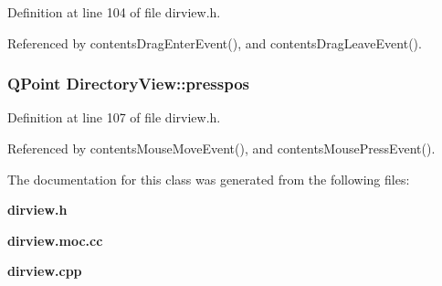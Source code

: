 Definition at line 104 of file dirview.h.

Referenced by contents\-Drag\-Enter\-Event(), and contents\-Drag\-Leave\-Event().
\subsubsection{\setlength{\rightskip}{0pt plus 5cm}QPoint {\bf Directory\-View::presspos}\hspace{0.3cm}{\tt  [private]}}\label{classDirectoryView_DirectoryViewr4}




Definition at line 107 of file dirview.h.

Referenced by contents\-Mouse\-Move\-Event(), and contents\-Mouse\-Press\-Event().

The documentation for this class was generated from the following files:\begin{CompactItemize}
\item 
{\bf dirview.h}\item 
{\bf dirview.moc.cc}\item 
{\bf dirview.cpp}\end{CompactItemize}
